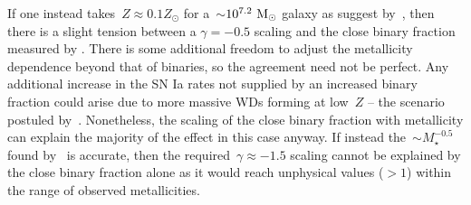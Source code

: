 \documentclass[ms.tex]{subfiles}
\begin{document}
If one instead takes~$Z \approx 0.1Z_\odot$ for a~$\sim$$10^{7.2}~\text{M}_\odot$ galaxy
as suggest by~\citet{Andrews2013}, then there is a slight tension between a
$\gamma = -0.5$ scaling and the close binary fraction measured by
\citet{Moe2019}.
There is some additional freedom to adjust the metallicity dependence beyond
that of binaries, so the agreement need not be perfect.
Any additional increase in the SN Ia rates not supplied by an increased binary
fraction could arise due to more massive WDs forming at low~$Z$ -- the scenario
postuled by~\citet{Kistler2013}.
Nonetheless, the scaling of the close binary fraction with metallicity can
explain the majority of the effect in this case anyway.
If instead the~$\sim M_\star^{-0.5}$ found by~\citet{Brown2019} is accurate,
then the required~$\gamma \approx -1.5$ scaling cannot be explained by the
close binary fraction alone as it would reach unphysical values ($>1$) within
the range of observed metallicities.
\end{document}
